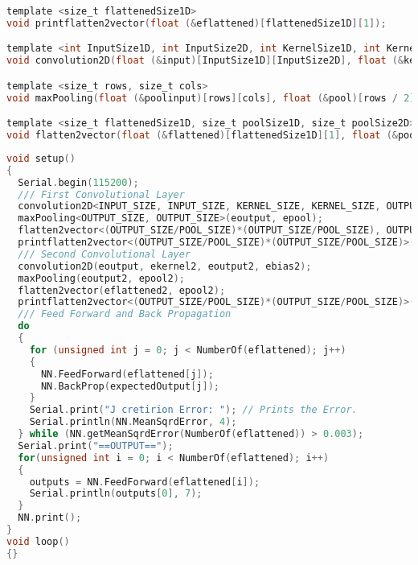 \begin{lstlisting}[language=C, caption={Constants for a simple CNN}]
template <size_t flattenedSize1D> 
void printflatten2vector(float (&eflattened)[flattenedSize1D][1]);

template <int InputSize1D, int InputSize2D, int KernelSize1D, int KernelSize2D, int OutputSize1D, int OutputSize2D>
void convolution2D(float (&input)[InputSize1D][InputSize2D], float (&kernel)[KernelSize1D][KernelSize2D], float (&output)[OutputSize1D][OutputSize2D], float bias);

template <size_t rows, size_t cols>
void maxPooling(float (&poolinput)[rows][cols], float (&pool)[rows / 2][cols / 2]);

template <size_t flattenedSize1D, size_t poolSize1D, size_t poolSize2D>
void flatten2vector(float (&flattened)[flattenedSize1D][1], float (&pool)[poolSize1D][poolSize2D]);
\end{lstlisting}

\newpage

\begin{lstlisting}[language=C, caption={Loop and Setup functions for a simple CNN}]
void setup()
{
  Serial.begin(115200);
  /// First Convolutional Layer
  convolution2D<INPUT_SIZE, INPUT_SIZE, KERNEL_SIZE, KERNEL_SIZE, OUTPUT_SIZE, OUTPUT_SIZE>(einput, ekernel, eoutput, ebias);
  maxPooling<OUTPUT_SIZE, OUTPUT_SIZE>(eoutput, epool);
  flatten2vector<(OUTPUT_SIZE/POOL_SIZE)*(OUTPUT_SIZE/POOL_SIZE), OUTPUT_SIZE/POOL_SIZE, OUTPUT_SIZE/POOL_SIZE>(eflattened, epool);
  printflatten2vector<(OUTPUT_SIZE/POOL_SIZE)*(OUTPUT_SIZE/POOL_SIZE)>(eflattened);
  /// Second Convolutional Layer
  convolution2D(eoutput, ekernel2, eoutput2, ebias2);
  maxPooling(eoutput2, epool2);
  flatten2vector(eflattened2, epool2);
  printflatten2vector<(OUTPUT_SIZE/POOL_SIZE)*(OUTPUT_SIZE/POOL_SIZE)>(eflattened2);
  /// Feed Forward and Back Propagation
  do
  {
    for (unsigned int j = 0; j < NumberOf(eflattened); j++)
    {
      NN.FeedForward(eflattened[j]);
      NN.BackProp(expectedOutput[j]);
    }
    Serial.print("J cretirion Error: "); // Prints the Error.
    Serial.println(NN.MeanSqrdError, 4);
  } while (NN.getMeanSqrdError(NumberOf(eflattened)) > 0.003);
  Serial.print("==OUTPUT==");
  for(unsigned int i = 0; i < NumberOf(eflattened); i++)
  {
    outputs = NN.FeedForward(eflattened[i]);
    Serial.println(outputs[0], 7);
  }
  NN.print();
}
void loop()
{}
\end{lstlisting}

\newpage

